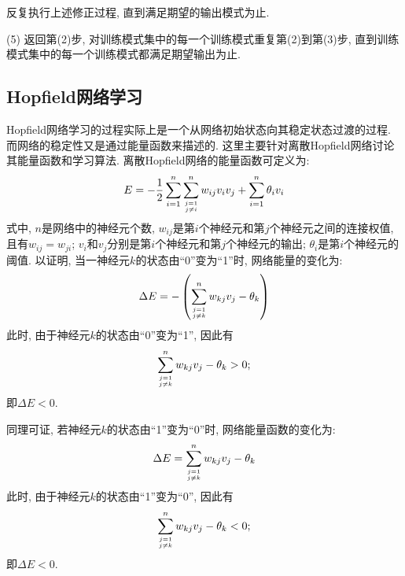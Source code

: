     反复执行上述修正过程, 直到满足期望的输出模式为止.

(5) 返回第(2)步, 对训练模式集中的每一个训练模式重复第(2)到第(3)步, 直到训练模式集中的每一个训练模式都满足期望输出为止.
\subsection{Hopfield网络学习}
Hopfield网络学习的过程实际上是一个从网络初始状态向其稳定状态过渡的过程. 而网络的稳定性又是通过能量函数来描述的. 这里主要针对离散Hopfield网络讨论其能量函数和学习算法.
离散Hopfield网络的能量函数可定义为:
\begin{align}
    E=-\frac{1}{2} \sum_{i=1}^{n} \sum_{j=1 \atop j \neq i}^{n} w_{i j} v_{i} v_{j}+\sum_{i=1}^{n} \theta_{i} v_{i}
\end{align}
式中, $n$是网络中的神经元个数, $w_{ij}$是第$i$个神经元和第$j$个神经元之间的连接权值, 且有$w_{ij}=w_{ji}$;  $v_i$和$v_j$分别是第$i$个神经元和第$j$个神经元的输出; $\theta_i$是第$i$个神经元的阈值.
以证明, 当一神经元$k$的状态由“0”变为“1”时, 网络能量的变化为:
\begin{align}
    \Delta E=-\left(\sum_{j=1 \atop j \neq k}^{n} w_{k j} v_{j}-\theta_{k}\right)
\end{align}
此时, 由于神经元$k$的状态由“0”变为“1”, 因此有
\begin{align}
    \sum_{j=1 \atop j \neq k}^{n} w_{k j} v_{j}-\theta_{k}>0;
\end{align}
即$\Delta E<0$.

同理可证, 若神经元$k$的状态由“1”变为“0”时, 网络能量函数的变化为:
\begin{align}
    \Delta E=\sum_{j=1 \atop j \neq k}^{n} w_{k j} v_{j}-\theta_{k}
\end{align}
此时, 由于神经元$k$的状态由“1”变为“0”, 因此有
\begin{align}
    \sum_{j=1 \atop j \neq k}^{n} w_{k j} v_{j}-\theta_{k}<0;
\end{align}
即$\Delta E<0$.

